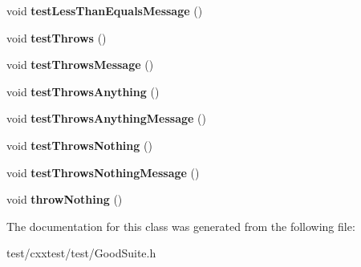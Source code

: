 \begin{DoxyCompactItemize}
\item 
\hypertarget{classGoodSuite_ae9fad919f0c203819a9c1215f328688a}{void {\bfseries test\-Less\-Than\-Equals\-Message} ()}\label{classGoodSuite_ae9fad919f0c203819a9c1215f328688a}

\item 
\hypertarget{classGoodSuite_a55520e6a17615257bcc673feb327d95e}{void {\bfseries test\-Throws} ()}\label{classGoodSuite_a55520e6a17615257bcc673feb327d95e}

\item 
\hypertarget{classGoodSuite_af64ca73c4b48551c99965307b688aa83}{void {\bfseries test\-Throws\-Message} ()}\label{classGoodSuite_af64ca73c4b48551c99965307b688aa83}

\item 
\hypertarget{classGoodSuite_a8ebcbe38d39e0a24d19e5e21f9cfeea9}{void {\bfseries test\-Throws\-Anything} ()}\label{classGoodSuite_a8ebcbe38d39e0a24d19e5e21f9cfeea9}

\item 
\hypertarget{classGoodSuite_a6968a4eaf1fb9a492c19a7a9faf41f95}{void {\bfseries test\-Throws\-Anything\-Message} ()}\label{classGoodSuite_a6968a4eaf1fb9a492c19a7a9faf41f95}

\item 
\hypertarget{classGoodSuite_ab47d4f9c2e46b8b86a15509e439c0b89}{void {\bfseries test\-Throws\-Nothing} ()}\label{classGoodSuite_ab47d4f9c2e46b8b86a15509e439c0b89}

\item 
\hypertarget{classGoodSuite_aeb2efd255b6bb9d46c7f360ea3d2b6b4}{void {\bfseries test\-Throws\-Nothing\-Message} ()}\label{classGoodSuite_aeb2efd255b6bb9d46c7f360ea3d2b6b4}

\item 
\hypertarget{classGoodSuite_a53af03aea352e53e0f59d6dc74acc2d3}{void {\bfseries throw\-Nothing} ()}\label{classGoodSuite_a53af03aea352e53e0f59d6dc74acc2d3}

\end{DoxyCompactItemize}


The documentation for this class was generated from the following file\-:\begin{DoxyCompactItemize}
\item 
test/cxxtest/test/Good\-Suite.\-h\end{DoxyCompactItemize}
